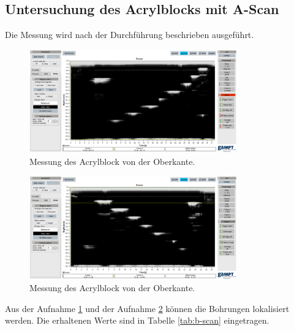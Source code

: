 \subsection{Untersuchung des Acrylblocks mit A-Scan}
Die Messung wird nach der Durchführung beschrieben ausgeführt.
\begin{figure}[H]
  \centering
  \includegraphics[width=0.8\textwidth]{content/bscan-2mhz_oberseite.png}
  \caption{Messung des Acrylblock von der Oberkante.}
  \label{fig:obs}
\end{figure}
\begin{figure}[H]
  \centering
  \includegraphics[width=0.8\textwidth]{content/bscan-2mhz_unterseite.png}
  \caption{Messung des Acrylblock von der Oberkante.}
  \label{fig:unts}
\end{figure}
Aus der Aufnahme \ref{fig:obs} und der Aufnahme \ref{fig:unts} können die Bohrungen lokalisiert werden.
Die erhaltenen Werte sind in Tabelle \ref{tab:b-scan} eingetragen.
